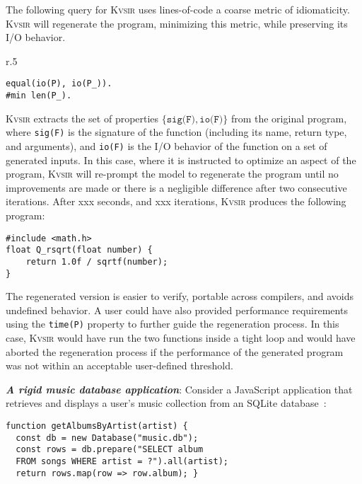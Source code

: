 \documentclass[sigplan]{acmart}
\newcommand{\sys}{{\scshape Kv{\textalpha}sir}\xspace}
\newcommand{\heading}[1]{\vspace{2pt}\noindent\textbf{\emph{#1}}:\enspace}
\newcommand{\ttt}[1]{\texttt{#1}}
\newcommand{\xxx}{\colorbox{red!30}{xxx}\xspace}
\begin{document}
The following query for \sys uses lines-of-code a coarse metric of
idiomaticity. \sys will regenerate the program, minimizing this metric, while
preserving its I/O behavior.
\begin{wrapfigure}[3]{r}{.5\columnwidth}
  \vspace{-5pt}
  \begin{verbatim}
equal(io(P), io(P_)).
#min len(P_).
  \end{verbatim}
\end{wrapfigure}
\sys extracts the set of properties $\{\texttt{sig(F)}, \texttt{io(F)}\}$ from the original program, where \texttt{sig(F)} is the
signature of the function (including its name, return type, and arguments), and \texttt{io(F)} is the I/O behavior of the function
on a set of generated inputs.
In this case, where it is instructed to optimize an aspect of the program, \sys will re-prompt
the model to regenerate the program until no improvements are made or there is a negligible difference after two consecutive iterations.
After \xxx seconds, and \xxx iterations, \sys produces the following program:
\begin{verbatim}
#include <math.h>
float Q_rsqrt(float number) {
    return 1.0f / sqrtf(number);
}
\end{verbatim}
The regenerated version is easier to verify, portable across compilers, and
avoids undefined behavior.
A user could have also provided performance requirements using 
the \ttt{time(P)} property to further guide the regeneration process.
In this case, \sys would have run the two functions inside a tight loop and 
would have aborted the regeneration process if the performance of the generated
program was not within an acceptable user-defined threshold.

\heading{A rigid music database application}
Consider a JavaScript application that retrieves and displays a user's music
collection from an SQLite database~\cite{codewithsadeemusicplayer, beets}:

\begin{verbatim}
function getAlbumsByArtist(artist) {
  const db = new Database("music.db");
  const rows = db.prepare("SELECT album
  FROM songs WHERE artist = ?").all(artist);
  return rows.map(row => row.album); }
\end{verbatim}
\end{document}
